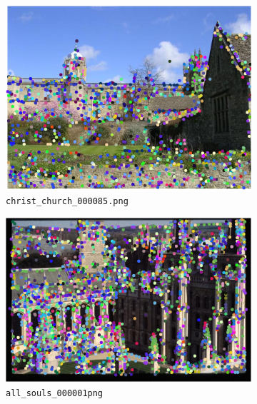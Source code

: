\documentclass[a4paper,10pt]{article}
\begin{document}
\begin{figure}
  \begin{subfigure}{0.49\textwidth}
    \centering
    \includegraphics[width=\textwidth,height=.3\textheight,keepaspectratio]{randomimage1}
    \caption{\texttt{christ\_church\_000085.png}}
    \label{sfig:cc85}
  \end{subfigure}
  \begin{subfigure}{0.49\textwidth}
    \centering
    \includegraphics[width=\textwidth,height=.3\textheight,keepaspectratio]{randomimage2}
    \caption{\texttt{all\_souls\_000001png}}
    \label{sfig:as1}
  \end{subfigure}
  \begin{subfigure}{0.49\textwidth}
    \centering

\end{subfigure}
\end{figure}
\end{document}
